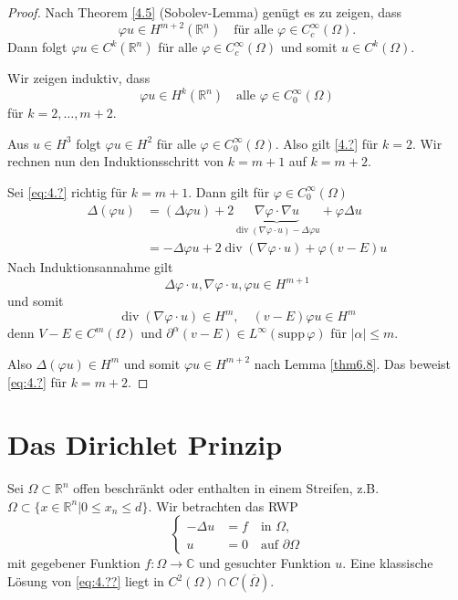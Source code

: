 \documentclass[
paper=a4,
bibtotocnumbered,
liststotocnumbered,
tablecaptionabove,
pointlessnumbers,
twoside,
openright,
10pt
]
{report}
\newcommand{\supp}{\mathrm{supp}\,}
\let\phi\varphi
\theoremstyle{definition}
\numberwithin{equation}{chapter}
\begin{document}
\begin{proof}
Nach Theorem \ref{4.5} (Sobolev-Lemma) genügt es zu zeigen, dass
\begin{equation}
\phi u \in H^{m+2}(\mathbb R^n) \quad \text{für alle } \phi \in C_c^\infty(\Omega).
\end{equation}
Dann folgt $\phi u \in C^k(\mathbb R^n)$ für alle $\phi \in C_c^\infty(\Omega)$ und somit $u\in C^k(\Omega)$.

Wir zeigen induktiv, dass
\begin{equation}
\phi u \in H^k(\mathbb R^n) \quad \text{alle } \phi \in C_0^\infty(\Omega)
\end{equation}
für $k=2, \ldots, m+2$.

Aus $u\in H^3$ folgt $\phi u\in H^2$ für alle $\phi \in C_0^\infty(\Omega)$. Also gilt \eqref{4.?} für $k=2$. Wir rechnen nun den Induktionsschritt von $k=m+1$ auf $k=m+2$.

Sei \eqref{eq:4.?} richtig für $k=m+1$. Dann gilt für $\phi \in C_0^\infty(\Omega)$
\begin{align}
\Delta(\phi u) &= (\Delta \phi u) + 2\underbrace{\nabla \phi \cdot \nabla u}_{\operatorname{div}(\nabla \phi \cdot u)- \Delta \phi u} + \phi \Delta u\\
&= - \Delta \phi u + 2\operatorname{div} (\nabla \phi \cdot u) + \phi(v-E) u
\end{align}
Nach Induktionsannahme gilt
\begin{equation}
\Delta \phi \cdot u, \nabla \phi \cdot u, \phi u \in H^{m+1}
\end{equation}
und somit
\begin{equation}
\operatorname{div}(\nabla \phi \cdot u) \in H^m, \quad (v-E) \phi u \in H^m
\end{equation}
denn $V-E\in C^m(\Omega)$ und $\partial^\alpha(v-E)\in L^\infty(\supp \phi)$ für $|\alpha|\le m$.

Also $\Delta (\phi u) \in H^m$ und somit $\phi u\in H^{m+2}$ nach Lemma \ref{thm6.8}. Das beweist \eqref{eq:4.?} für $k=m+2$.

\end{proof}


\section{Das Dirichlet Prinzip}
Sei $\Omega \subset \mathbb R^n$ offen beschränkt oder enthalten in einem Streifen, z.B. $\Omega \subset \{ x\in \mathbb R^n| 0 \le x_n \le d\}$.  Wir betrachten das RWP
\begin{equation}\label{eq:4.??}
\begin{cases}
-\Delta u&= f \quad \text{in } \Omega,\\
u&=0 \quad \text{auf } \partial \Omega
\end{cases}
\end{equation}
mit gegebener Funktion $f: \Omega \to \mathbb C$ und gesuchter Funktion $u$. Eine klassische Lösung von \eqref{eq:4.??} liegt in $C^2(\Omega) \cap C(\overline{\Omega})$.
\end{document}
